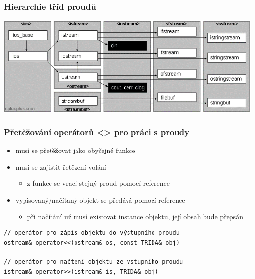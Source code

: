 \begin{frame}[fragile]
\frametitle{Hierarchie tříd proudů}

\includegraphics[width=\textwidth]{img/streamy.png}
\end{frame}






\begin{frame}[fragile]
\frametitle{Přetěžování operátorů <\/<, >\/> pro práci s proudy}

\begin{block}{}
\begin{itemize}
\item musí se přetěžovat jako obyčejné funkce
\item musí se zajistit řetězení volání 
\begin{itemize}
\item z funkce se vrací stejný proud pomocí reference
\end{itemize}
\item vypisovaný/načítaný objekt se předává pomocí reference
\begin{itemize}
\item při načítání už musí existovat instance objektu, její obsah bude přepsán
\end{itemize}
\end{itemize}
\end{block}

\begin{noteblock}{}
\begin{lstlisting}
// operátor pro zápis objektu do výstupního proudu
ostream& operator<<(ostream& os, const TRIDA& obj)

// operátor pro načtení objektu ze vstupního proudu
istream& operator>>(istream& is, TRIDA& obj)
\end{lstlisting}
\end{noteblock}
\end{frame}





